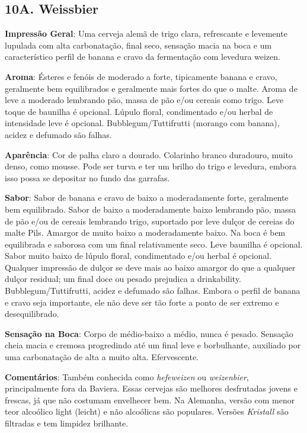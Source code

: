 \subsection*{10A. Weissbier}
\textbf{Impressão Geral}: Uma cerveja alemã de trigo clara, refrescante e levemente lupulada com alta carbonatação, final seco, sensação macia na boca e um característico perfil de banana e cravo da fermentação com levedura weizen.

\textbf{Aroma}: Ésteres e fenóis de moderado a forte, tipicamente banana e cravo, geralmente bem equilibrados e geralmente mais fortes do que o malte. Aroma de leve a moderado lembrando pão, massa de pão e/ou cereais como trigo. Leve toque de baunilha é opcional. Lúpulo floral, condimentado e/ou herbal de intensidade leve é opcional. Bubblegum/Tuttifrutti (morango com banana), acidez e defumado são falhas.

\textbf{Aparência}: Cor de palha claro a dourado. Colarinho branco duradouro, muito denso, como mousse. Pode ser turva e ter um brilho do trigo e levedura, embora isso possa se depositar no fundo das garrafas.

\textbf{Sabor}: Sabor de banana e cravo de baixo a moderadamente forte, geralmente bem equilibrado. Sabor de baixo a moderadamente baixo lembrando pão, massa de pão e/ou de cereais lembrando trigo, suportado por leve dulçor de cereias do malte Pils. Amargor de muito baixo a moderadamente baixo. Na boca é bem equilibrada e saborosa com um final relativamente seco. Leve baunilha é opcional. Sabor muito baixo de lúpulo floral, condimentado e/ou herbal é opcional. Qualquer impressão de dulçor se deve mais ao baixo amargor do que a qualquer dulçor residual; um final doce ou pesado prejudica a drinkability. Bubblegum/Tuttifrutti, acidez e defumado são falhas. Embora o perfil de banana e cravo seja importante, ele não deve ser tão forte a ponto de ser extremo e desequilibrado.

\textbf{Sensação na Boca}: Corpo de médio-baixo a médio, nunca é pesado. Sensação cheia macia e cremosa progredindo até um final leve e borbulhante, auxiliado por uma carbonatação de alta a muito alta. Efervescente.

\textbf{Comentários}: Também conhecida como \textit{hefeweizen} ou \textit{weizenbier}, principalmente fora da Baviera. Essas cervejas são melhores desfrutadas jovens e frescas, já que não costumam envelhecer bem. Na Alemanha, versão com menor teor alcoólico light (leicht) e não alcoólicas são populares. Versões \textit{Kristall} são filtradas e tem limpidez brilhante.

